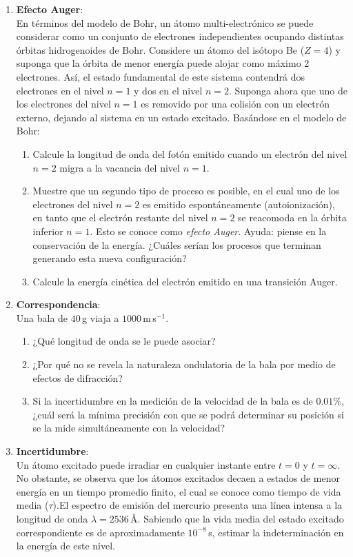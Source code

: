 \documentclass[a4paper,12pt]{article}
\begin{document}
\begin{enumerate}
\item {\bf{Efecto Auger}}:\\
	En términos del modelo de Bohr, un átomo multi-electrónico se puede
	considerar como un conjunto de electrones independientes ocupando distintas
	órbitas hidrogenoides de Bohr. Considere un átomo del isótopo Be ($Z=4$) y
	suponga que la órbita de menor energía puede alojar como máximo 2
	electrones. Así, el estado fundamental de este sistema contendrá dos
	electrones en el nivel $n = 1$ y dos en el nivel $n = 2$. Suponga ahora que
	uno de los electrones del nivel $n = 1$ es removido por una colisión con un
	electrón externo, dejando al sistema en un estado excitado. Basándose en el
	modelo de Bohr:
	
	\begin{enumerate}
		\item Calcule la longitud de onda del fotón emitido cuando un electrón
			del nivel $n = 2$ migra a la vacancia del nivel $n = 1$.
		\item Muestre que un segundo tipo de proceso es posible, en el cual uno
			de los electrones del nivel $n=2$ es emitido espontáneamente
			(autoionización), en tanto que el electrón restante del nivel $n=2$
			se reacomoda en la órbita inferior $n=1$. Esto se conoce como
			{\emph{efecto Auger}}. Ayuda: piense en la conservación de la
			energía. ¿Cuáles serían los procesos que terminan generando esta
			nueva configuración?
		\item Calcule la energía cinética del electrón emitido en una
			transición Auger.  
	\end{enumerate}

\item {\bf{Correspondencia}}:\\
	Una bala de $40$\,g viaja a $1000$\,m\,s$^{-1}$.
	\begin{enumerate}
		\item ¿Qué longitud de onda se le puede asociar? 
		\item ¿Por qué no se revela la naturaleza ondulatoria de la bala por
			medio de efectos de difracción? 
		\item Si la incertidumbre en la medición de la velocidad de la bala es
			de $0.01\%$, ¿cuál será la mínima precisión con que se podrá
			determinar su posición si se la mide simultáneamente con la
			velocidad?
	\end{enumerate}

\item {\bf{Incertidumbre}}:\\
	Un átomo excitado puede irradiar en cualquier instante entre $t = 0$ y $t =
	\infty$. No obstante, se observa que los átomos excitados decaen a estados
	de menor energía en un tiempo promedio finito, el cual se conoce como
	tiempo de vida media ($\tau$).El espectro de emisión del mercurio presenta
	una línea intensa a la longitud de onda $\lambda =2536$\,\AA. Sabiendo que
	la vida media del estado excitado correspondiente es de aproximadamente
	$10^{-8}$\,s, estimar la indeterminación en la energía de este nivel.

\end{enumerate}
\end{document}

